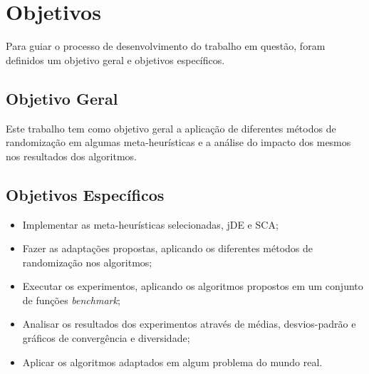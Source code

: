 

\section{Objetivos}

Para guiar o processo de desenvolvimento do trabalho em questão, foram definidos um objetivo geral e objetivos específicos.

\subsection{Objetivo Geral}

Este trabalho tem como objetivo geral a aplicação de diferentes métodos de randomização em algumas meta-heurísticas e a análise do impacto dos mesmos nos resultados dos algoritmos.

\subsection{Objetivos Específicos}

\begin{itemize}
    \item Implementar as meta-heurísticas selecionadas, jDE e SCA;
    \item Fazer as adaptações propostas, aplicando os diferentes métodos de randomização nos algoritmos;
    \item Executar os experimentos, aplicando os algoritmos propostos em um conjunto de funções \textit{benchmark};
    \item Analisar os resultados dos experimentos através de médias, desvios-padrão e gráficos de convergência e diversidade;
    \item Aplicar os algoritmos adaptados em algum problema do mundo real.
\end{itemize}

